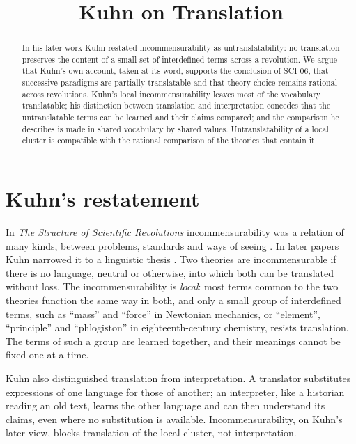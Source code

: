 \documentclass{situationist-preprint}
\title{Kuhn on Translation}
\begin{document}
\maketitle

\begin{abstract}
In his later work Kuhn restated incommensurability as untranslatability: no translation preserves the content of a small set of interdefined terms across a revolution. We argue that Kuhn's own account, taken at its word, supports the conclusion of SCI-06, that successive paradigms are partially translatable and that theory choice remains rational across revolutions. Kuhn's local incommensurability leaves most of the vocabulary translatable; his distinction between translation and interpretation concedes that the untranslatable terms can be learned and their claims compared; and the comparison he describes is made in shared vocabulary by shared values. Untranslatability of a local cluster is compatible with the rational comparison of the theories that contain it.
\end{abstract}

\section{Kuhn's restatement}\label{s:kuhn}

In \emph{The Structure of Scientific Revolutions} incommensurability was a relation of many kinds, between problems, standards and ways of seeing \citep{Kuhn1970}. In later papers Kuhn narrowed it to a linguistic thesis \citep{Kuhn1983}. Two theories are incommensurable if there is no language, neutral or otherwise, into which both can be translated without loss. The incommensurability is \emph{local}: most terms common to the two theories function the same way in both, and only a small group of interdefined terms, such as \enquote{mass} and \enquote{force} in Newtonian mechanics, or \enquote{element}, \enquote{principle} and \enquote{phlogiston} in eighteenth-century chemistry, resists translation. The terms of such a group are learned together, and their meanings cannot be fixed one at a time.

Kuhn also distinguished translation from interpretation. A translator substitutes expressions of one language for those of another; an interpreter, like a historian reading an old text, learns the other language and can then understand its claims, even where no substitution is available. Incommensurability, on Kuhn's later view, blocks translation of the local cluster, not interpretation.
\end{document}
